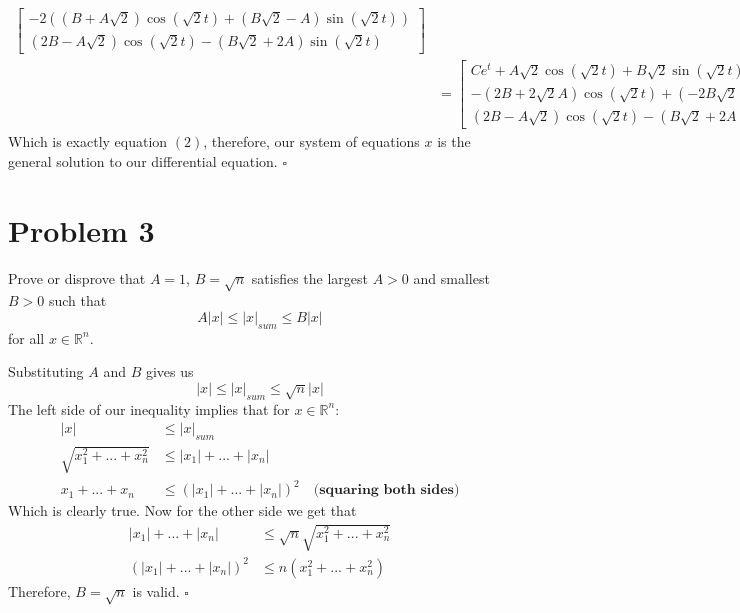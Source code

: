 \documentclass[11pt]{article}
\newcommand{\R}{\mathbb{R}}
\newenvironment{proof}{\noindent{\bf Proof.}}{\hfill $\square$\medskip}
\begin{document}
\begin{proof}
\begin{equation}
\begin{split}
\begin{bmatrix}
                -2\left((B+A\sqrt{2})\cos(\sqrt{2}t)+(B\sqrt{2}-A)\sin(\sqrt{2}t)\right)\\
                (2B-A\sqrt{2})\cos(\sqrt{2}t)-(B\sqrt{2}+2A)\sin(\sqrt{2}t)
            \end{bmatrix}\\
            &=\begin{bmatrix}
                Ce^{t}+A\sqrt{2}\cos(\sqrt{2}t)+B\sqrt{2}\sin(\sqrt{2}t)\\
                -(2B+2\sqrt{2}A)\cos(\sqrt{2}t)+(-2B\sqrt{2}+2A)\sin(\sqrt{2}t)\\
                (2B-A\sqrt{2})\cos(\sqrt{2}t)-(B\sqrt{2}+2A)\sin(\sqrt{2}t)
            \end{bmatrix}
        \end{split}
    \end{equation}
    Which is exactly equation $(2)$, therefore, our system of equations $x$ is the general solution to our
    differential equation.
\end{proof}

\section{Problem 3}
Prove or disprove that $A=1$, $B=\sqrt{n}$ satisfies the largest $A>0$ and smallest
$B>0$ such that
$$A\lvert x\rvert\leq\lvert x\rvert_{sum}\leq B\lvert x\rvert$$
for all $x\in\R^{n}$.

\begin{proof}
Substituting $A$ and $B$ gives us
$$\lvert x\rvert\leq\lvert x\rvert_{sum}\leq \sqrt{n}\lvert x\rvert$$
The left side of our inequality implies that for $x\in\R^{n}$:
\begin{equation}
    \begin{split}
        \lvert x\rvert&\leq\lvert x\rvert_{sum}\\
        \sqrt{x_{1}^{2}+...+x_{n}^{2}}&\leq\lvert x_{1}\rvert+...+\lvert x_{n}\rvert\\
        x_{1}+...+x_{n}&\leq\left(\lvert x_{1}\rvert+...+\lvert x_{n}\rvert\right)^{2}\quad
        \textbf{(squaring both sides)}
    \end{split}
\end{equation}
Which is clearly true. Now for the other side we get that
\begin{equation}
    \begin{split}
        \lvert x_{1}\rvert+...+\lvert x_{n}\rvert&\leq\sqrt{n}\sqrt{x_{1}^{2}+...+x_{n}^{2}}\\
        (\lvert x_{1}\rvert+...+\lvert x_{n}\rvert)^{2}&\leq n(x_{1}^{2}+...+x_{n}^{2})
    \end{split}
\end{equation}
Therefore, $B=\sqrt{n}$ is valid.
\end{proof}
\end{document}
